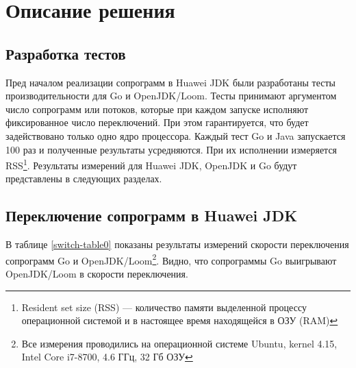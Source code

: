 \section{Описание решения}
	
	\subsection{Разработка тестов}
	Пред началом реализации сопрограмм в Huawei JDK были разработаны тесты
	производительности для Go и OpenJDK/Loom. 
	Тесты принимают аргументом число сопрограмм или потоков, которые при каждом запуске
	исполняют фиксированное число переключений. При этом гарантируется, что будет задействовано  
	только одно ядро процессора. Каждый тест Go и Java запускается 100 раз и полученные результаты усредняются.
	При их исполнении измеряется RSS\footnote{Resident set size (RSS) — количество памяти
	выделенной процессу операционной системой и в настоящее время находящейся в ОЗУ (RAM)}.
	Результаты измерений для Huawei JDK, OpenJDK и Go будут представлены в следующих разделах.
	\clearpage
	
	\subsection{Переключение сопрограмм в Huawei JDK}
	В таблице \ref{switch-table0} показаны результаты измерений скорости переключения сопрограмм Go и 
	OpenJDK/Loom\footnote{Все измерения проводились на операционной системе Ubuntu, kernel 4.15, Intel Core i7-8700,
	4.6 ГГц, 32 Гб ОЗУ}. Видно, что сопрограммы Go выигрывают OpenJDK/Loom в скорости переключения.
	
